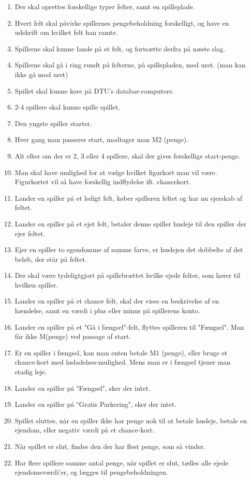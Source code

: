 \begin{enumerate}
\item Der skal oprettes forskellige typer felter, samt en spilleplade.
\item Hvert felt skal påvirke spillernes pengebeholdning forskelligt, og have en udskrift om hvilket felt han ramte.
\item Spillerne skal kunne lande på et felt, og fortsætte derfra på næste slag.
\item Spillerne skal gå i ring rundt på felterne, på spillepladen, med uret. (man kan ikke gå mod uret)
\item Spillet skal kunne køre på DTU's databar-computere.
\item 2-4 spillere skal kunne spille spillet.
\item Den yngste spiller starter.
\item Hver gang man passerer start, modtager man M2 (penge).
\item Alt efter om der er 2, 3 eller 4 spillere, skal der gives forskellige start-penge.

\item Man skal have mulighed for at vælge hvilket figurkort man vil være. \\Figurkortet vil så have forskellig indflydelse ift. chancekort.

\item Lander en spiller på et ledigt felt, køber spilleren feltet og har nu ejerskab af feltet.
\item Lander en spiller på et ejet felt, betaler denne spiller husleje til den spiller der ejer feltet.
\item Ejer en spiller to egendomme af samme farve, er huslejen det dobbelte af det beløb, der står på feltet.

\item Der skal være tydeligtgjort på spillebrættet hvilke ejede felter, som hører til hvilken spiller.

\item Lander en spiller på et chance felt, skal der vises en beskrivelse af en hændelse, samt en værdi i plus eller minus på spillerens konto.
\item Lander en spiller på et "Gå i fængsel"-felt, flyttes spilleren til "Fængsel". Man får ikke M(penge) ved passage af start.

\item Er en spiller i fængsel, kan man enten betale M1 (penge), eller bruge et chance-kort med løsladelses-mulighed. Mens man er i fængsel tjener man stadig leje.
\item Lander en spiller på "Fængsel", sker der intet.
\item Lander en spiller på "Gratis Parkering", sker der intet.
\item Spillet sluttes, når en spiller ikke har penge nok til at betale husleje, betale en ejendom, eller negativ værdi på et chance-kort.
\item Når spillet er slut, findes den der har flest penge, som så vinder.
\item Har flere spillere samme antal penge, når spillet er slut, tælles alle ejede ejendomsværdi'er, og lægges til pengebeholdningen.


\end{enumerate}
